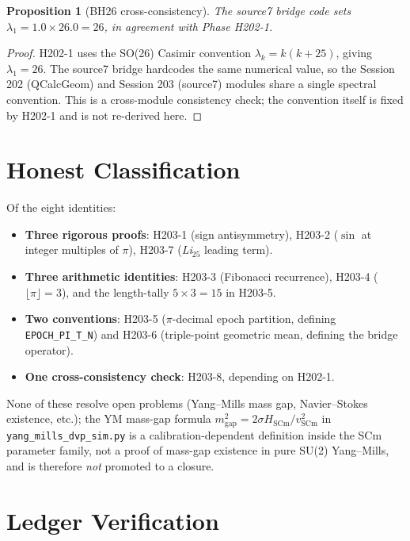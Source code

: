 \documentclass[11pt,letterpaper]{article}
\theoremstyle{plain}
\newtheorem{prop}[thm]{Proposition}
\theoremstyle{definition}
\begin{document}
\begin{prop}[BH26 cross-consistency]
The source7 bridge code sets $\lambda_1 = 1.0 \times 26.0 = 26$, in
agreement with Phase H202-1.
\end{prop}

\begin{proof}
H202-1 uses the SO(26) Casimir convention $\lambda_k = k(k+25)$, giving
$\lambda_1 = 26$. The source7 bridge hardcodes the same numerical value,
so the Session 202 (QCalcGeom) and Session 203 (source7) modules share a
single spectral convention. This is a cross-module consistency check;
the convention itself is fixed by H202-1 and is not re-derived here.
\end{proof}

\section{Honest Classification}

Of the eight identities:

\begin{itemize}
   \item \textbf{Three rigorous proofs}: H203-1 (sign antisymmetry),
         H203-2 ($\sin$ at integer multiples of $\pi$), H203-7
         (\textit{Li}$_{25}$ leading term).
   \item \textbf{Three arithmetic identities}: H203-3 (Fibonacci
         recurrence), H203-4 ($\lfloor \pi \rfloor = 3$), and the
         length-tally $5 \times 3 = 15$ in H203-5.
   \item \textbf{Two conventions}: H203-5 ($\pi$-decimal epoch
         partition, defining \texttt{EPOCH\_PI\_T\_N}) and H203-6
         (triple-point geometric mean, defining the bridge operator).
   \item \textbf{One cross-consistency check}: H203-8, depending on
         H202-1.
\end{itemize}

None of these resolve open problems (Yang--Mills mass gap, Navier--Stokes
existence, etc.); the YM mass-gap formula
$m_{\text{gap}}^2 = 2\sigma H_{\text{SCm}}/v_{\text{SCm}}^2$ in
\texttt{yang\_mills\_dvp\_sim.py} is a calibration-dependent definition
inside the SCm parameter family, not a proof of mass-gap existence in
pure SU(2) Yang--Mills, and is therefore \emph{not} promoted to a
closure.

\section{Ledger Verification}
\end{document}
